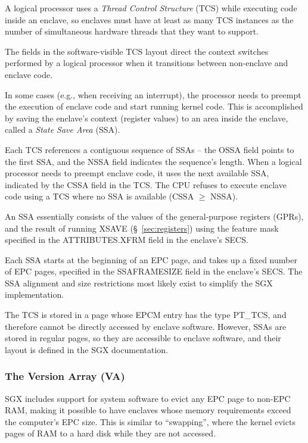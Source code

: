 A logical processor uses a \textit{Thread Control Structure} (TCS) while
executing code inside an enclave, so enclaves must have at least as many TCS
instances as the number of simultaneous hardware threads that they want to
support.

The fields in the software-visible TCS layout direct the context switches
performed by a logical processor when it transitions between non-enclave and
enclave code.


In some cases (e.g., when receiving an interrupt), the processor needs to
preempt the execution of enclave code and start running kernel code. This is
accomplished by saving the enclave's context (register values) to an area
inside the enclave, called a \textit{State Save Area} (SSA).

Each TCS references a contiguous sequence of SSAs -- the OSSA field points to
the first SSA, and the NSSA field indicates the sequence's length. When a
logical processor needs to preempt enclave code, it uses the next available
SSA, indicated by the CSSA field in the TCS. The CPU refuses to execute enclave
code using a TCS where no SSA is available (CSSA $\ge$ NSSA).

An SSA essentially consists of the values of the general-purpose registers
(GPRs), and the result of running XSAVE (\S~\ref{sec:registers}) using the
feature mask specified in the ATTRIBUTES.XFRM field in the enclave's SECS.


Each SSA starts at the beginning of an EPC page, and takes up a fixed number of
EPC pages, specified in the SSAFRAMESIZE field in the enclave's SECS. The SSA
alignment and size restrictions most likely exist to simplify the SGX
implementation.

The TCS is stored in a page whose EPCM entry has the type PT\_TCS, and
therefore cannot be directly accessed by enclave software. However, SSAs are
stored in regular pages, so they are accessible to enclave software, and their
layout is defined in the SGX documentation.

\subsubsection{The Version Array (VA)}
\label{sec:va}

SGX includes support for system software to evict any EPC page to non-EPC RAM,
making it possible to have enclaves whose memory requirements exceed the
computer's EPC size. This is similar to ``swapping'', where the kernel evicts
pages of RAM to a hard disk while they are not accessed.

